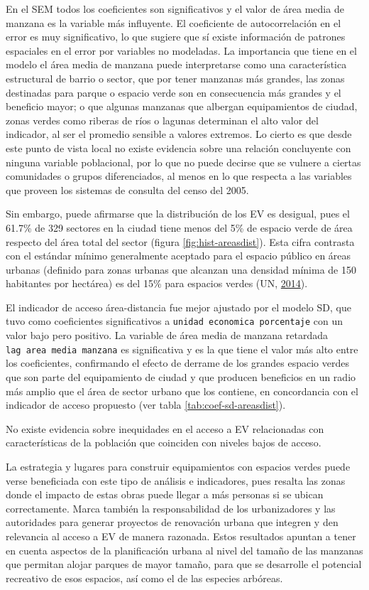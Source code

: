 \documentclass[12pt,a4paper,openany]{book}
\theoremstyle{definition}
\theoremstyle{definition}
\theoremstyle{definition}
\theoremstyle{remark}
\begin{document}
En el SEM todos los coeficientes son significativos y el valor de área
media de manzana es la variable más influyente. El coeficiente de
autocorrelación en el error es muy significativo, lo que sugiere que sí
existe información de patrones espaciales en el error por variables no
modeladas. La importancia que tiene en el modelo el área media de
manzana puede interpretarse como una característica estructural de
barrio o sector, que por tener manzanas más grandes, las zonas
destinadas para parque o espacio verde son en consecuencia más grandes y
el beneficio mayor; o que algunas manzanas que albergan equipamientos de
ciudad, zonas verdes como riberas de ríos o lagunas determinan el alto
valor del indicador, al ser el promedio sensible a valores extremos. Lo
cierto es que desde este punto de vista local no existe evidencia sobre
una relación concluyente con ninguna variable poblacional, por lo que no
puede decirse que se vulnere a ciertas comunidades o grupos
diferenciados, al menos en lo que respecta a las variables que proveen
los sistemas de consulta del censo del 2005.

Sin embargo, puede afirmarse que la distribución de los EV es desigual,
pues el 61.7\% de 329 sectores en la ciudad tiene menos del 5\% de
espacio verde de área respecto del área total del sector (figura
\ref{fig:hist-areasdist}). Esta cifra contrasta con el estándar mínimo
generalmente aceptado para el espacio público en áreas urbanas (definido
para zonas urbanas que alcanzan una densidad mínima de 150 habitantes
por hectárea) es del 15\% para espacios verdes (UN,
\protect\hyperlink{ref-un2014sdg}{2014}).

El indicador de acceso área-distancia fue mejor ajustado por el modelo
SD, que tuvo como coeficientes significativos a
\texttt{unidad\ economica\ porcentaje} con un valor bajo pero positivo.
La variable de área media de manzana retardada
\texttt{lag\ area\ media\ manzana} es significativa y es la que tiene el
valor más alto entre los coeficientes, confirmando el efecto de derrame
de los grandes espacio verdes que son parte del equipamiento de ciudad y
que producen beneficios en un radio más amplio que el área de sector
urbano que los contiene, en concordancia con el indicador de acceso
propuesto (ver tabla \ref{tab:coef-sd-areasdist}).

No existe evidencia sobre inequidades en el acceso a EV relacionadas con
características de la población que coinciden con niveles bajos de
acceso.

La estrategia y lugares para construir equipamientos con espacios verdes
puede verse beneficiada con este tipo de análisis e indicadores, pues
resalta las zonas donde el impacto de estas obras puede llegar a más
personas si se ubican correctamente. Marca también la responsabilidad de
los urbanizadores y las autoridades para generar proyectos de renovación
urbana que integren y den relevancia al acceso a EV de manera razonada.
Estos resultados apuntan a tener en cuenta aspectos de la planificación
urbana al nivel del tamaño de las manzanas que permitan alojar parques
de mayor tamaño, para que se desarrolle el potencial recreativo de esos
espacios, así como el de las especies arbóreas.
\end{document}

